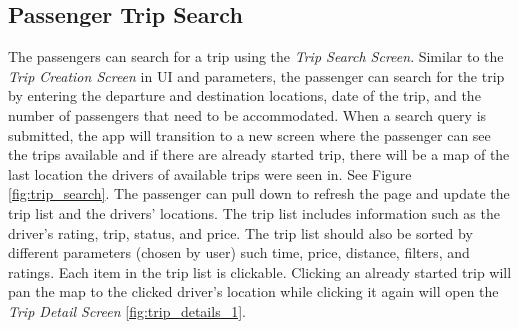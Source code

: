 \documentclass[a4paper, 12pt]{report} %
\begin{document}
        \pagebreak
        \subsection{Passenger Trip Search}
            The passengers can search for a trip using the \textit{Trip Search Screen}. Similar to the \textit{Trip Creation Screen} in UI and parameters, the passenger can search for the trip by entering the departure and destination locations, date of the trip, and the number of passengers that need to be accommodated. When a search query is submitted, the app will transition to a new screen where the passenger can see the trips available and if there are already started trip, there will be a map of the last location the drivers of available trips were seen in. See Figure \ref{fig:trip_search}. The passenger can pull down to refresh the page and update the trip list and the drivers' locations. The trip list includes information such as the driver's rating, trip, status, and price. The trip list should also be sorted by different parameters (chosen by user) such time, price, distance, filters, and ratings. Each item in the trip list is clickable. Clicking an already started trip will pan the map to the clicked driver's location while clicking it again will open the \textit{Trip Detail Screen} \ref{fig:trip_details_1}. 
\end{document}
